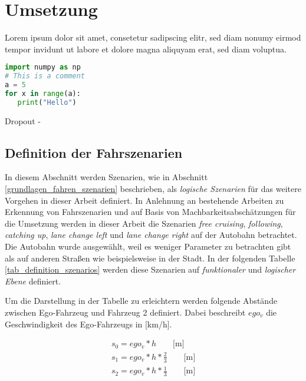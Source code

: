 
\chapter{Umsetzung}
\label{umsetzung}

Lorem ipsum dolor sit amet, consetetur sadipscing elitr, sed diam nonumy eirmod tempor invidunt ut labore et dolore magna aliquyam erat, sed diam voluptua.


\begin{lstlisting}[language=Python]
import numpy as np
# This is a comment
a = 5
for x in range(a):
   print("Hello")
\end{lstlisting}


Dropout - \cite{hinton2012improving}


\section{Definition der Fahrszenarien}
\label{umsetzung_definition}

In diesem Abschnitt werden Szenarien, wie in Abschnitt \ref{grundlagen_fahren_szenarien} beschrieben, als \textit{logische Szenarien} für das weitere Vorgehen in dieser Arbeit definiert. In Anlehnung an bestehende Arbeiten zu Erkennung von Fahrszenarien und auf Basis von Machbarkeitsabschätzungen für die Umsetzung werden in dieser Arbeit die Szenarien \textit{free cruising}, \textit{following}, \textit{catching up}, \textit{lane change left} und \textit{lane change right} auf der Autobahn betrachtet. Die Autobahn wurde ausgewählt, weil es weniger Parameter zu betrachten gibt als auf anderen Straßen wie beispielsweise in der Stadt. In der folgenden Tabelle \ref{tab_definition_szenarios} werden diese Szenarien auf \textit{funktionaler} und \textit{logischer Ebene} definiert.

Um die Darstellung in der Tabelle zu erleichtern werden folgende Abstände zwischen Ego-Fahrzeug und Fahrzeug 2 definiert. Dabei beschreibt $ego_v$ die Geschwindigkeit des Ego-Fahrzeugs in [km/h].

\begin{equation*}
\begin{split}
s_0 = ego_v * h \qquad \text{[m]} \\
s_1 = ego_v * h * \frac{2}{3} \qquad \text{[m]} \\
s_2 = ego_v * h * \frac{1}{3} \qquad \text{[m]} \\
\end{split}
\end{equation*}

